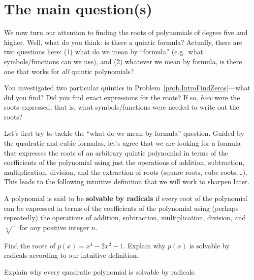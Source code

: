 \section{The main question(s)}
We now turn our attention to finding the roots of polynomials of degree five and higher. Well, what do you think: is there a quintic formula? Actually, there are two questions here: (1) what do we mean by ``formula'' (e.g.~what symbols/functions can we use), and (2) whatever we mean by formula, is there one that works for \emph{all} quintic polynomials?

You investigated two particular quintics in Problem~\ref{prob.IntroFindZeros}---what did you find? Did you find exact expressions for the roots? If so, \emph{how} were the roots expressed; that is, what symbols/functions were needed to write out the roots? 

Let's first try to tackle the ``what do we mean by formula'' question. Guided by the quadratic and cubic formulas, let's agree that we are looking for a formula that expresses the roots of an arbitrary quintic polynomial in terms of the coefficients of the polynomial using just the operations of addition, subtraction, multiplication, division, and the extraction of roots (square roots, cube roots,\ldots). This leads to the following intuitive definition that we will work to sharpen later.

\begin{intuitivedef}
A polynomial is said to be \textbf{solvable by radicals} if every root of the polynomial can be expressed in terms of the coefficients of the polynomial using (perhaps repeatedly) the operations of addition, subtraction, multiplication, division, and $\sqrt[n]{\phantom{x}}$ for any positive integer $n$.
\end{intuitivedef}

\begin{problem}
Find the roots of $p(x) = x^4 - 2x^2 -1$. Explain why $p(x)$ is solvable by radicals according to our intuitive definition.
\end{problem}

\begin{problem}
Explain why every quadratic polynomial is solvable by radicals.
\end{problem}

